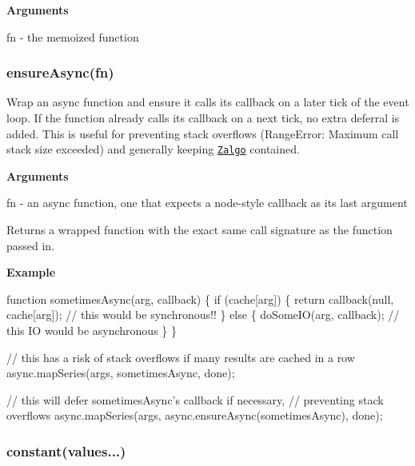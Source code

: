 {\bfseries Arguments}


\begin{DoxyItemize}
\item {\ttfamily fn} -\/ the memoized function 


\end{DoxyItemize}

\label{_ensureAsync}%
 \subsubsection*{ensure\+Async(fn)}

Wrap an async function and ensure it calls its callback on a later tick of the event loop. If the function already calls its callback on a next tick, no extra deferral is added. This is useful for preventing stack overflows ({\ttfamily Range\+Error\+: Maximum call stack size exceeded}) and generally keeping \href{http://blog.izs.me/post/59142742143/designing-apis-for-asynchrony}{\tt Zalgo} contained.

{\bfseries Arguments}


\begin{DoxyItemize}
\item {\ttfamily fn} -\/ an async function, one that expects a node-\/style callback as its last argument
\end{DoxyItemize}

Returns a wrapped function with the exact same call signature as the function passed in.

{\bfseries Example}


\begin{DoxyCode}
function sometimesAsync(arg, callback) \{
  if (cache[arg]) \{
    return callback(null, cache[arg]); // this would be synchronous!!
  \} else \{
    doSomeIO(arg, callback); // this IO would be asynchronous
  \}
\}

// this has a risk of stack overflows if many results are cached in a row
async.mapSeries(args, sometimesAsync, done);

// this will defer sometimesAsync's callback if necessary,
// preventing stack overflows
async.mapSeries(args, async.ensureAsync(sometimesAsync), done);
\end{DoxyCode}
 



\label{_constant}%
 \subsubsection*{constant(values...)}

